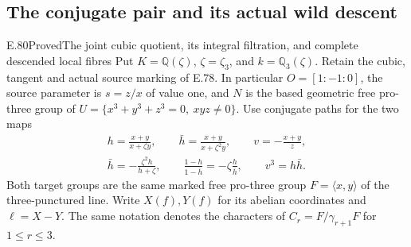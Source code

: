 \subsection{The conjugate pair and its actual wild descent}

\begin{statement}{E.80}{Proved}{The joint cubic quotient, its integral filtration, and complete descended local fibres}
Put $K=\mathbb Q(\zeta)$, $\zeta=\zeta_3$, and
$k=\mathbb Q_3(\zeta)$. Retain the cubic, tangent and
actual source marking of E.78. In particular
$O=[1:-1:0]$, the source parameter is $s=z/x$ of value
one, and $N$ is the based geometric free pro-three
group of $U=\{x^3+y^3+z^3=0,\ xyz\ne0\}$.
Use conjugate paths for the two maps
\[
 \begin{gathered}
 h=\frac{x+y}{x+\zeta y},\qquad
 \bar h=\frac{x+y}{x+\zeta^2y},\qquad
 v=-\frac{x+y}{z},\\
 \bar h=-\frac{\zeta^2h}{h+\zeta},\qquad
 \frac{1-h}{1-\bar h}=-\zeta\frac h{\bar h},\qquad
 v^3=h\bar h.
 \end{gathered}
 \tag{E80.1}
\]
Both target groups are the same marked free pro-three
group $F=\langle x,y\rangle$ of the three-punctured
line. Write $X(f),Y(f)$ for its abelian coordinates
and $\ell=X-Y$. The same notation denotes the
characters of $C_r=F/\gamma_{r+1}F$ for $1\le r\le3$.


\end{statement}
